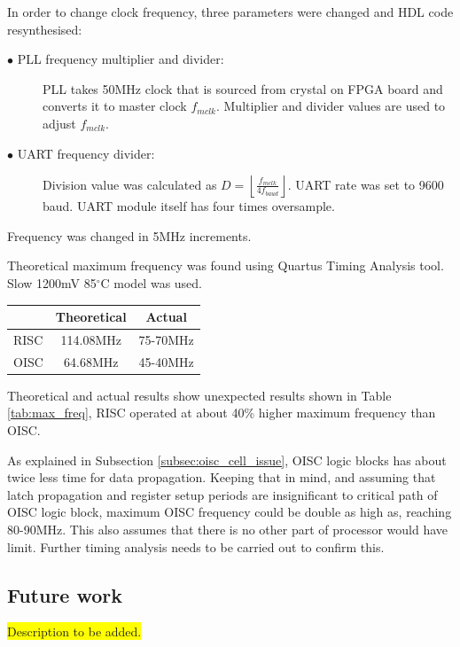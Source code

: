 In order to change clock frequency, three parameters were changed and HDL code resynthesised: 
\begin{description}
	\item[$\bullet$ PLL frequency multiplier and divider:]
	PLL takes 50MHz clock that is sourced from crystal on FPGA board and converts it to master clock $f_{mclk}$. Multiplier and divider values are used to adjust $f_{mclk}$.
	
	\item[$\bullet$ UART frequency divider:]
	Division value was calculated as $D = \left \lfloor \frac{f_{mclk}}{4 f_{baud}} \right \rfloor$. UART rate was set to 9600 baud. UART module itself has four times oversample. 
\end{description}
Frequency was changed in 5MHz increments. 

Theoretical maximum frequency was found using Quartus Timing Analysis tool. Slow 1200mV 85$^{\circ}$C model was used. 

\begin{center}
	\begin{tabular}{ l | c | c  }
		     & Theoretical & Actual \\ \hline
		RISC & 114.08MHz & 75-70MHz \\ \hline
		OISC & 64.68MHz & 45-40MHz \\
	\end{tabular}
	\label{tab:max_freq}
\end{center}

Theoretical and actual results show unexpected results shown in Table \ref{tab:max_freq}, RISC operated at about 40\% higher maximum frequency than OISC.

As explained in Subsection \ref{subsec:oisc_cell_issue}, OISC logic blocks has about twice less time for data propagation. Keeping that in mind, and assuming that latch propagation and register setup periods are insignificant to critical path of OISC logic block, maximum OISC frequency could be double as high as, reaching 80-90MHz. This also assumes that there is no other part of processor would have limit. Further timing analysis needs to be carried out to confirm this.

\subsection{Future work}
\colorbox{yellow}{Description to be added.}

